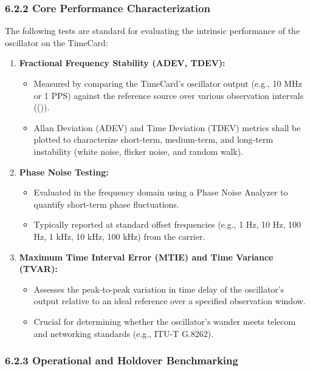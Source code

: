 \documentclass[
]{article}
\begin{document}
\subsubsection{6.2.2 Core Performance
Characterization}\label{core-performance-characterization}

The following tests are standard for evaluating the intrinsic
performance of the oscillator on the TimeCard:

\begin{enumerate}
\item
  \textbf{Fractional Frequency Stability (ADEV, TDEV):}

  \begin{itemize}
  \item
    Measured by comparing the TimeCard's oscillator output (e.g., 10 MHz
    or 1 PPS) against the reference source over various observation
    intervals (()).
  \item
    Allan Deviation (ADEV) and Time Deviation (TDEV) metrics shall be
    plotted to characterize short-term, medium-term, and long-term
    instability (white noise, flicker noise, and random walk).
  \end{itemize}
\item
  \textbf{Phase Noise Testing:}

  \begin{itemize}
  \item
    Evaluated in the frequency domain using a Phase Noise Analyzer to
    quantify short-term phase fluctuations.
  \item
    Typically reported at standard offset frequencies (e.g., 1 Hz, 10
    Hz, 100 Hz, 1 kHz, 10 kHz, 100 kHz) from the carrier.
  \end{itemize}
\item
  \textbf{Maximum Time Interval Error (MTIE) and Time Variance (TVAR):}

  \begin{itemize}
  \item
    Assesses the peak-to-peak variation in time delay of the
    oscillator's output relative to an ideal reference over a specified
    observation window.
  \item
    Crucial for determining whether the oscillator's wander meets
    telecom and networking standards (e.g., ITU-T G.8262).
  \end{itemize}
\end{enumerate}

\subsubsection{6.2.3 Operational and Holdover
Benchmarking}\label{operational-and-holdover-benchmarking}
\end{document}
